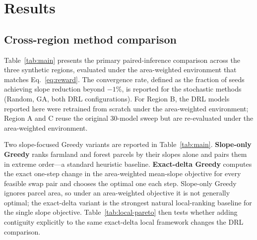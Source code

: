 \documentclass[]{interact}
\theoremstyle{plain}
\begin{document}
\section{Results}\label{sec:results}

\subsection{Cross-region method comparison}\label{sec:results-main}

Table~\ref{tab:main} presents the primary paired-inference comparison across the three synthetic regions, evaluated under the area-weighted environment that matches Eq.~\eqref{eq:reward}. The convergence rate, defined as the fraction of seeds achieving slope reduction beyond $-1\%$, is reported for the stochastic methods (Random, GA, both DRL configurations). For Region B, the DRL models reported here were retrained from scratch under the area-weighted environment; Region A and C reuse the original 30-model sweep but are re-evaluated under the area-weighted environment.

Two slope-focused Greedy variants are reported in Table~\ref{tab:main}. \textbf{Slope-only Greedy} ranks farmland and forest parcels by their slopes alone and pairs them in extreme order---a standard heuristic baseline. \textbf{Exact-delta Greedy} computes the exact one-step change in the area-weighted mean-slope objective for every feasible swap pair and chooses the optimal one each step. Slope-only Greedy ignores parcel area, so under an area-weighted objective it is not generally optimal; the exact-delta variant is the strongest natural local-ranking baseline for the single slope objective. Table~\ref{tab:local-pareto} then tests whether adding contiguity explicitly to the same exact-delta local framework changes the DRL comparison.
\end{document}
